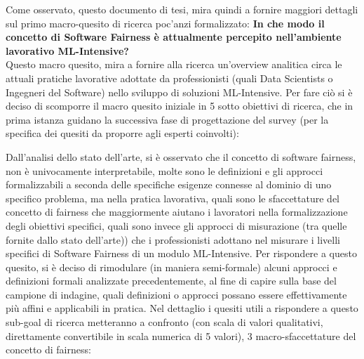 	Come osservato, questo documento di tesi, mira quindi a fornire maggiori dettagli sul primo macro-quesito di ricerca poc'anzi formalizzato: \textbf{In che modo il concetto di Software Fairness è attualmente percepito nell'ambiente lavorativo ML-Intensive?}\\
	Questo macro quesito, mira a fornire alla ricerca un'overview analitica circa le attuali pratiche lavorative adottate da professionisti (quali Data Scientists o Ingegneri del Software) nello sviluppo di soluzioni ML-Intensive. Per fare ciò si è deciso di scomporre il macro quesito iniziale in 5 sotto obiettivi di ricerca, che in prima istanza guidano la successiva fase di progettazione del survey (per la specifica dei quesiti da proporre agli esperti coinvolti):\\
	
	\begin{center}
			\hspace*{-5mm}%
	\end{center}


	Dall'analisi dello stato dell'arte, si è osservato che il concetto di software fairness, non è univocamente interpretabile, molte sono le definizioni e gli approcci formalizzabili a seconda delle specifiche esigenze connesse al dominio di uno specifico problema, ma nella pratica lavorativa, quali sono le sfaccettature del concetto di fairness che maggiormente aiutano i lavoratori nella formalizzazione degli obiettivi specifici, quali sono invece gli approcci di misurazione (tra quelle fornite dallo stato dell'arte)) che i professionisti adottano nel misurare i livelli specifici di Software Fairness di un modulo ML-Intensive. Per rispondere a questo quesito, si è deciso di rimodulare (in maniera semi-formale) alcuni approcci e definizioni formali analizzate precedentemente, al fine di capire sulla base del campione di indagine, quali definizioni o approcci possano essere effettivamente più affini e applicabili in pratica. Nel dettaglio i quesiti utili a rispondere a questo sub-goal di ricerca metteranno a confronto (con scala di valori qualitativi, direttamente convertibile in scala numerica di 5 valori), 3 macro-sfaccettature del concetto di fairness:
	
